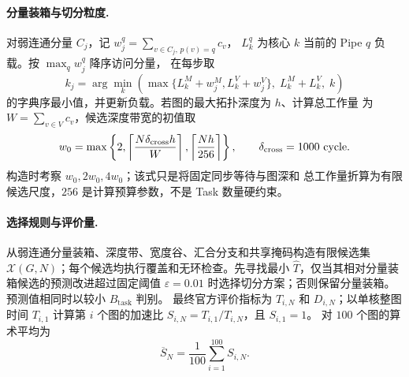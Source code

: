 \paragraph{分量装箱与切分粒度.}
对弱连通分量 $C_j$，记 $w_j^q=\sum_{v\in C_j,\,p(v)=q}c_v$，
$L_k^q$ 为核心 $k$ 当前的 Pipe $q$ 负载。按 $\max_q w_j^q$ 降序访问分量，
在每步取
\begin{equation}
k_j=\arg\min_k\left(
\max\{L_k^M+w_j^M,L_k^V+w_j^V\},\;
L_k^M+L_k^V,\;k\right)
\end{equation}
的字典序最小值，并更新负载。若图的最大拓扑深度为 $h$、计算总工作量
为 $W=\sum_{v\in V}c_v$，候选深度带宽的初值取
\begin{equation}
w_0=\max\left\{2,\left\lceil\frac{N\delta_{\rm cross}h}{W}\right\rceil,
\left\lceil\frac{Nh}{256}\right\rceil\right\},\qquad
\delta_{\rm cross}=1000\ \mathrm{cycle}.
\end{equation}
构造时考察 $w_0,2w_0,4w_0$；该式只是将固定同步等待与图深和
总工作量折算为有限候选尺度，$256$ 是计算预算参数，不是 Task 数量硬约束。

\paragraph{选择规则与评价量.}
从弱连通分量装箱、深度带、宽度谷、汇合分支和共享掩码构造有限候选集
$\mathcal X(G,N)$；每个候选均执行覆盖和无环检查。先寻找最小
$\widehat T$，仅当其相对分量装箱候选的预测改进超过固定阈值
$\varepsilon=0.01$ 时选择切分方案；否则保留分量装箱。
预测值相同时以较小 $B_{\mathrm{task}}$ 判别。
最终官方评价指标为 $T_{i,N}$ 和 $D_{i,N}$；以单核整图时间 $T_{i,1}$
计算第 $i$ 个图的加速比 $S_{i,N}=T_{i,1}/T_{i,N}$，且 $S_{i,1}=1$。
对 $100$ 个图的算术平均为
\begin{equation}
\overline S_N=\frac{1}{100}\sum_{i=1}^{100}S_{i,N}.
\end{equation}
